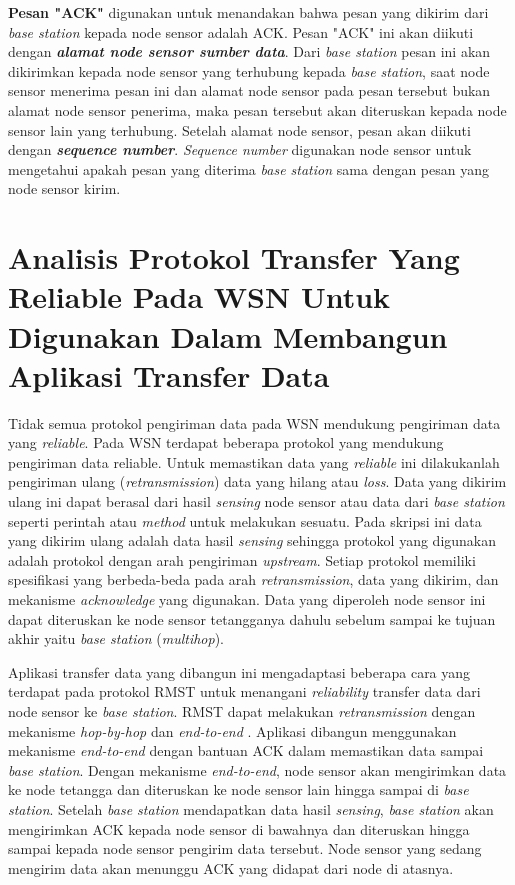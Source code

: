 \textbf{Pesan "ACK"} digunakan untuk menandakan bahwa pesan yang dikirim dari \textit{base station} kepada node sensor adalah ACK. Pesan "ACK" ini akan diikuti dengan \textbf{\textit{alamat node sensor sumber data}}. Dari \textit{base station} pesan ini akan dikirimkan kepada node sensor yang terhubung kepada \textit{base station}, saat node sensor menerima pesan ini dan alamat node sensor pada pesan tersebut bukan alamat node sensor penerima, maka pesan tersebut akan diteruskan kepada node sensor lain yang terhubung. Setelah alamat node sensor, pesan akan diikuti dengan \textbf{\textit{sequence number}}. \textit{Sequence number} digunakan node sensor untuk mengetahui apakah pesan yang diterima \textit{base station} sama dengan pesan yang node sensor kirim.

\section{Analisis Protokol Transfer Yang Reliable Pada WSN Untuk Digunakan Dalam Membangun Aplikasi Transfer Data}
Tidak semua protokol pengiriman data pada WSN mendukung pengiriman data yang \textit{reliable}. Pada WSN terdapat beberapa protokol yang mendukung pengiriman data reliable. Untuk memastikan data yang \textit{reliable} ini dilakukanlah pengiriman ulang (\textit{retransmission}) data yang hilang atau \textit{loss}. Data yang dikirim ulang ini dapat berasal dari hasil \textit{sensing} node sensor atau data dari \textit{base station} seperti perintah atau \textit{method} untuk melakukan sesuatu. Pada skripsi ini data yang dikirim ulang adalah data hasil \textit{sensing} sehingga protokol yang digunakan adalah protokol dengan arah pengiriman \textit{upstream}. Setiap protokol memiliki spesifikasi yang berbeda-beda pada arah \textit{retransmission}, data yang dikirim, dan mekanisme \textit{acknowledge} yang digunakan. Data yang diperoleh node sensor ini dapat diteruskan ke node sensor tetangganya dahulu sebelum sampai ke tujuan akhir yaitu \textit{base station} (\textit{multihop}). 

Aplikasi transfer data yang dibangun ini mengadaptasi beberapa cara yang terdapat pada protokol RMST untuk menangani \textit{reliability} transfer data dari node sensor ke \textit{base station}. RMST dapat melakukan \textit{retransmission} dengan mekanisme \textit{hop-by-hop} dan \textit{end-to-end} \cite{rmst}. Aplikasi dibangun menggunakan mekanisme \textit{end-to-end} dengan bantuan ACK dalam memastikan data sampai \textit{base station}. Dengan mekanisme \textit{end-to-end}, node sensor akan mengirimkan data ke node tetangga dan diteruskan ke node sensor lain hingga sampai di \textit{base station}. Setelah \textit{base station} mendapatkan data hasil \textit{sensing}, \textit{base station} akan mengirimkan ACK kepada node sensor di bawahnya dan diteruskan hingga sampai kepada node sensor pengirim data tersebut. Node sensor yang sedang mengirim data akan menunggu ACK yang didapat dari node di atasnya.

